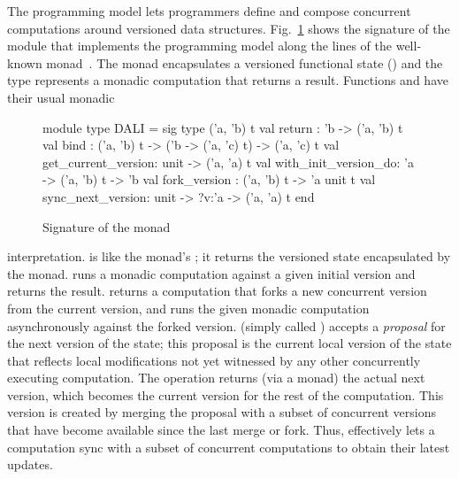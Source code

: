 The \name programming model lets programmers define and compose
concurrent computations around versioned data structures.
Fig.~\ref{fig:dali-monad} shows the signature of the \name module that
implements the programming model along the lines of the well-known
 monad~\cite{wadler-monad}. The monad encapsulates a
versioned functional state () and the type 
represents a monadic computation that returns a  result.
Functions  and  have their usual monadic
\begin{figure}
\begin{center}
  \begin{ocaml}
  module type DALI = sig
    type ('a, 'b) t
    val return : 'b -> ('a, 'b) t
    val bind : ('a, 'b) t -> ('b -> ('a, 'c) t) -> ('a, 'c) t
    val get_current_version: unit -> ('a, 'a) t
    val with_init_version_do: 'a -> ('a, 'b) t -> 'b
    val fork_version : ('a, 'b) t -> 'a unit t
    val sync_next_version: unit -> ?v:'a -> ('a, 'a) t
  end
  \end{ocaml}
\label{fig:dali-monad}
\caption{Signature of the \name monad}
\end{center}
\end{figure}
interpretation.  is like the 
monad's ; it returns the versioned state encapsulated by the
monad.  runs a monadic computation against
a given initial version and returns the result. 
returns a computation that forks a new concurrent version from the
current version, and runs the given monadic computation asynchronously
against the forked version.   (simply called
) accepts a \emph{proposal} for the next version of the state;
this proposal is the current local version of the state that reflects
local modifications not yet witnessed by any other concurrently
executing computation.  The operation returns (via a monad) the actual
next version, which becomes the current version for the rest of the
computation.  This version is created by merging the proposal with a
subset of concurrent versions that have become available since the
last merge or fork. Thus,  effectively lets a computation sync
with a subset of concurrent computations to obtain their latest
updates.

